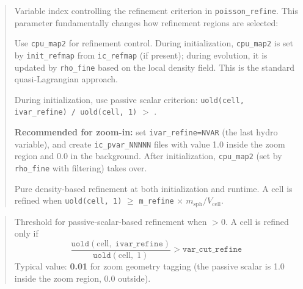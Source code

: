 \begin{quote}
Variable index controlling the refinement criterion in
\texttt{poisson\_refine}.  This parameter fundamentally changes how
refinement regions are selected:
\begin{description}[style=nextline,leftmargin=1em]
  \item[\texttt{ivar\_refine = 0}:]
    Use \texttt{cpu\_map2} for refinement control.  During
    initialization, \texttt{cpu\_map2} is set by
    \texttt{init\_refmap} from \texttt{ic\_refmap} (if present);
    during evolution, it is updated by \texttt{rho\_fine} based on
    the local density field.  This is the standard quasi-Lagrangian
    approach.


  \item[\texttt{ivar\_refine > 0} (e.g.\ 11):]
    During initialization, use passive scalar criterion:
    \texttt{uold(cell, ivar\_refine) / uold(cell, 1)} $>$
    .

    \textbf{Recommended for zoom-in:} set
    \texttt{ivar\_refine=NVAR} (the last hydro variable), and create
    \texttt{ic\_pvar\_NNNNN} files with value 1.0 inside the zoom
    region and 0.0 in the background.  After initialization,
    \texttt{cpu\_map2} (set by \texttt{rho\_fine} with
     filtering) takes over.

  \item[\texttt{ivar\_refine < 0} (default):]
    Pure density-based refinement at both initialization and runtime.
    A cell is refined when
    \texttt{uold(cell, 1)} $\geq$ \texttt{m\_refine}
    $\times\; m_{\text{sph}} / V_{\text{cell}}$.
\end{description}
\end{quote}

\label{param:var_cut_refine}

\begin{quote}
Threshold for passive-scalar-based refinement when
 $> 0$.  A cell is refined only if
\[
  \frac{\texttt{uold}(\text{cell},\;\texttt{ivar\_refine})}%
       {\texttt{uold}(\text{cell},\;1)}
  > \texttt{var\_cut\_refine}
\]
Typical value: \textbf{0.01} for zoom geometry tagging (the passive
scalar is 1.0 inside the zoom region, 0.0 outside).
\end{quote}

